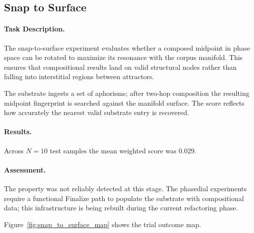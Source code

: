 \subsection{Snap to Surface}
\label{sec:snap_to_surface}

\paragraph{Task Description.}
The snap-to-surface experiment evaluates whether a composed midpoint in
phase space can be rotated to maximize its resonance with the corpus
manifold. This ensures that compositional results land on valid
structural nodes rather than falling into interstitial regions between
attractors.

The substrate ingests a set of aphorisms; after two-hop composition the
resulting midpoint fingerprint is searched against the manifold surface.
The score reflects how accurately the nearest valid substrate entry is
recovered.

\paragraph{Results.}
Across $N = 10$ test samples the mean weighted score was 0.029.

\paragraph{Assessment.}
The property was not reliably detected at this stage.  The phasedial
experiments require a functional Finalize path to populate the substrate
with compositional data; this infrastructure is being rebuilt during
the current refactoring phase.

Figure~\ref{fig:snap_to_surface_map} shows the trial outcome map.
